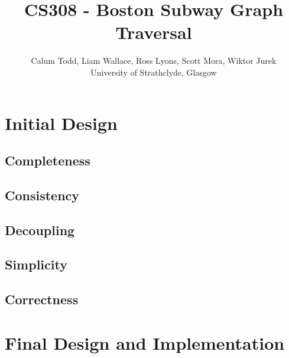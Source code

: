 \documentclass[a4paper,11pt]{article}
\title{CS308 - Boston Subway Graph Traversal}
\author{Calum Todd, Liam Wallace, Ross Lyons, Scott Mora, Wiktor Jurek\\
\small University of Strathclyde, Glasgow\\
}
\begin{document}
\clearpage
\maketitle
\newpage

\section{Initial Design}
\subsection{Completeness}
\subsection{Consistency}
\subsection{Decoupling}
\subsection{Simplicity}
\subsection{Correctness}

\section{Final Design and Implementation}
\end{document}
